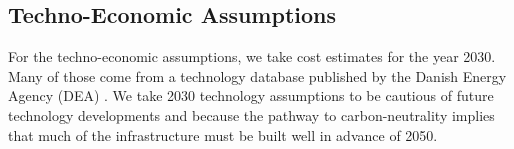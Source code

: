 \begin{landscape}



\section{Techno-Economic Assumptions}
\label{sec:si:costs}

For the techno-economic assumptions, we take cost estimates for the year 2030.
Many of those come from a technology database published by the Danish Energy
Agency (DEA) . We take 2030 technology assumptions to be cautious of
future technology developments and because the pathway to carbon-neutrality
implies that much of the infrastructure must be built well in advance of 2050.

\begin{small}

\end{small}

\end{landscape}

\restoregeometry